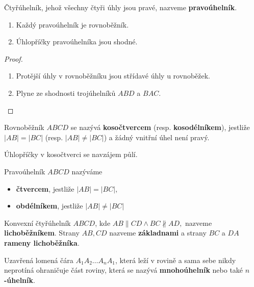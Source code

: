\begin{definition}
  Čtyřúhelník, jehož všechny čtyři úhly jsou pravé, nazveme \textbf{pravoúhelník}.
\end{definition}

\begin{veta}
  \begin{enumerate}[$i.$]
    \item Každý pravoúhelník je rovnoběžník.
    \item Úhlopříčky pravoúhelníka jsou shodné.
  \end{enumerate}
\end{veta}

\begin{proof}
  \begin{enumerate}[$i.$]
    \item Protější úhly v rovnoběžníku jsou střídavé úhly u rovnoběžek.
    \item Plyne ze shodnosti trojúhelníků $ABD$ a $BAC$.\qedhere
  \end{enumerate}
\end{proof}

\begin{definition}
  Rovnoběžník $ABCD$ se nazývá \textbf{kosočtvercem} (resp. \textbf{kosodélníkem}), jestliže $|AB|=|BC|$ (resp. $|AB| \neq |BC|$) a žádný vnitřní úhel není pravý.
\end{definition}


\begin{veta}
  Úhlopříčky v kosočtverci se navzájem půlí.
\end{veta}

\begin{definition}
  Pravoúhelník $ABCD$ nazýváme
  \begin{itemize}
    \item \textbf{čtvercem}, jestliže $|AB|=|BC|,$
    \item \textbf{obdélníkem}, jestliže $|AB| \ne |BC|$
  \end{itemize}
\end{definition}

\begin{definition}
  Konvexní čtyřúhelník $ABCD$, kde $AB \parallel CD \land BC \nparallel AD,$ nazveme \textbf{lichoběžníkem}. Strany $AB, CD$ nazveme \textbf{základnami} a strany $BC$ a $DA$ \textbf{rameny lichoběžníka}.
\end{definition}

\begin{definition}
  Uzavřená lomená čára $A_1A_2\dots A_nA_1$, která leží v rovině a sama sebe nikdy neprotíná ohraničuje část roviny, která se nazývá \textbf{mnohoúhelník} nebo také \textbf{$n$-úhelník}.
\end{definition}


